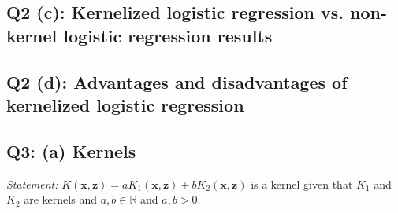 \documentclass[11pt]{amsart}
\newcommand{\vek}[1]{\mathbf{#1}}
\begin{document}
\subsection{Q2 (c): Kernelized logistic regression vs. non-kernel logistic regression results}


\subsection{Q2 (d): Advantages and disadvantages of kernelized logistic regression}

\subsection{Q3: (a) Kernels}

{\it Statement:} $K(\vek{x}, \vek{z}) = aK_1(\vek{x}, \vek{z}) + bK_{2}(\vek{x}, \vek{z})$ is a kernel given that $K_1$ and $K_2$ are kernels and $a,b \in \mathbb{R}$ and $a, b > 0$.
\end{document}

